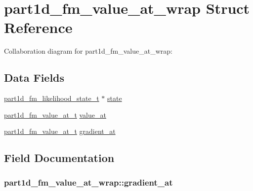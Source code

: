 \hypertarget{structpart1d__fm__value__at__wrap}{}\section{part1d\+\_\+fm\+\_\+value\+\_\+at\+\_\+wrap Struct Reference}
\label{structpart1d__fm__value__at__wrap}


Collaboration diagram for part1d\+\_\+fm\+\_\+value\+\_\+at\+\_\+wrap\+:
\subsection*{Data Fields}
\begin{DoxyCompactItemize}
\item 
\hyperlink{forwardmodel_8h_ab3cac657468dcba4666b4eb0e6014c97}{part1d\+\_\+fm\+\_\+likelihood\+\_\+state\+\_\+t} $\ast$ \hyperlink{structpart1d__fm__value__at__wrap_a94f89fa9972dde27d2b75543ae82d295}{state}
\item 
\hyperlink{forwardmodel_8h_ae0748a5b083292dc628303c679b25b2f}{part1d\+\_\+fm\+\_\+value\+\_\+at\+\_\+t} \hyperlink{structpart1d__fm__value__at__wrap_a3b289f35e7e55e2d91d9f889789f66d9}{value\+\_\+at}
\item 
\hyperlink{forwardmodel_8h_ae0748a5b083292dc628303c679b25b2f}{part1d\+\_\+fm\+\_\+value\+\_\+at\+\_\+t} \hyperlink{structpart1d__fm__value__at__wrap_a311502e07100a1cd1878a2a7cebe141f}{gradient\+\_\+at}
\end{DoxyCompactItemize}


\subsection{Field Documentation}
\subsubsection[{\texorpdfstring{gradient\+\_\+at}{gradient_at}}]{ part1d\+\_\+fm\+\_\+value\+\_\+at\+\_\+wrap\+::gradient\+\_\+at}\hypertarget{structpart1d__fm__value__at__wrap_a311502e07100a1cd1878a2a7cebe141f}{}\label{structpart1d__fm__value__at__wrap_a311502e07100a1cd1878a2a7cebe141f}

